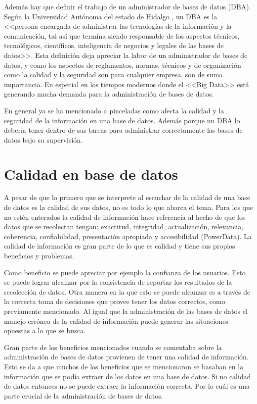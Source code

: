 \documentclass[12pt, article, natbib]{IEEEtran}
\begin{document}
Además hay que definir el trabajo de un administrador de bases de datos (DBA). Según la Universidad Autónoma del estado de Hidalgo \cite{defdba}, un DBA es la <<persona encargada de administrar las tecnologías de la información y la comunicación, tal así que termina siendo responsable de los aspectos técnicos, tecnológicos, científicos, inteligencia de negocios y legales de las bases de datos>>. Esta definición deja apreciar la labor de un administrador de bases de datos, y como los aspectos de reglamentos, normas, técnicos y de organización como la calidad y la seguridad son para cualquier empresa, son de suma importancia. En especial en los tiempos modernos donde el <<Big Data>> está generando mucha demanda para la administración de bases de datos.

En general ya se ha mencionado a pinceladas como afecta la calidad y la seguridad de la información en una base de datos. Además porque un DBA lo debería tener dentro de sus tareas para administrar correctamente las bases de datos bajo su supervisión. 

\section{Calidad en base de datos}

A pesar de que lo primero que se interprete al escuchar de la calidad de una base de datos es la calidad de sus datos, no es todo lo que abarca el tema. Para los que no estén enterados la calidad de información hace referencia al hecho de que los datos que se recolectan tengan: exactitud, integridad, actualización, relevancia, coherencia, confiabilidad, presentación apropiada y accesibilidad (PowerData\cite{powerdatacalidad}). La calidad de información es gran parte de lo que es calidad y tiene sus propios beneficios y problemas.

Como beneficio se puede apreciar por ejemplo la confianza de los usuarios. Esto se puede lograr alcanzar por la consistencia de reportar los resultados de la recolección de datos. Otra manera en la que esto se puede alcanzar es a través de la correcta toma de decisiones que provee tener los datos correctos, como previamente mencionado. Al igual que la administración de las bases de datos el manejo erróneo de la calidad de información puede generar las situaciones opuestas a lo que se busca.

Gran parte de los beneficios mencionados cuando se comentaba sobre la administración de bases de datos provienen de tener una calidad de información. Esto se da a que muchos de los beneficios que se mencionaron se basaban en la información que se podía extraer de los datos en una base de datos. Si no calidad de datos entonces no se puede extraer la información correcta. Por lo cuál es una parte crucial de la administración de bases de datos.
\end{document}
